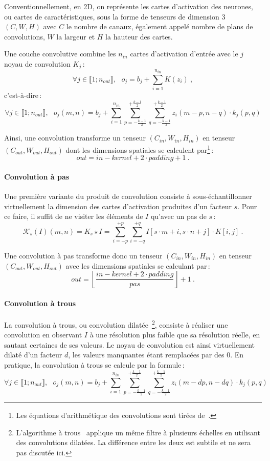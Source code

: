 Conventionnellement, en 2D, on représente les cartes d'activation des neurones, ou cartes de caractéristiques, sous la forme de tenseurs de dimension 3 $(C, W, H)$ avec $C$ le nombre de canaux, également appelé nombre de plans de convolutions, $W$ la largeur et $H$ la hauteur des cartes.

Une couche convolutive combine les $n_{in}$ cartes d'activation d'entrée avec le $j$\ieme{} noyau de convolution $K_j$\,:
$$\forall j \in \llbracket 1;n_{out} \rrbracket,~~~o_j = b_j + \sum_{i=1}^{n_{in}} K(z_i)~,$$ c'est-à-dire\,:
$$\forall j \in \llbracket 1;n_{out} \rrbracket,~~~o_j(m, n) = b_j + \sum_{i=1}^{n_{in}} \sum_{p=-\frac{k-1}{2}}^{+\frac{k-1}{2}} \sum_{q=-\frac{k-1}{2}}^{+\frac{k-1}{2}} z_i(m - p, n - q) \cdot k_j(p, q)$$

Ainsi, une convolution transforme un tenseur $(C_{in}, W_{in}, H_{in})$ en tenseur $(C_{out}, W_{out}, H_{out})$ dont les dimensions spatiales se calculent par\footnote{Les équations d'arithmétique des convolutions sont tirées de~\citet{dumoulin_guide_2016}.}\,:
$$\mathit{out} = \mathit{in} - \mathit{kernel} + 2\cdot \mathit{padding} + 1~.$$

\paragraph{Convolution à pas}

Une première variante du produit de convolution consiste à sous-échantillonner virtuellement la dimension des cartes d'activation produites d'un facteur $s$. Pour ce faire, il suffit de ne visiter les éléments de $I$ qu'avec un pas de $s$\,:
$$\mathcal{K}_s(I)(m,n) = K_s \star I = \sum_{i=-p}^{+p} \sum_{i=-q}^{+q} I[s \cdot m + i, s \cdot n + j] \cdot K[i, j]~.$$

Une convolution à pas transforme donc un tenseur $(C_{in}, W_{in}, H_{in})$ en tenseur $(C_{out}, W_{out}, H_{out})$ avec les dimensions spatiales se calculant par\,:
$$\mathit{out} = \left\lfloor \frac{\mathit{in} - \mathit{kernel} + 2 \cdot \mathit{padding}}{\mathit{pas}}\right\rfloor + 1~.$$

\paragraph{Convolution à trous}

La convolution à trous, ou convolution dilatée~\cite{yu_multi-scale_2015}\footnote{L'algorithme à trous~\cite{shensa_discrete_1992} applique un même filtre à plusieurs échelles en utilisant des convolutions dilatées. La différence entre les deux est subtile et ne sera pas discutée ici.}, consiste à réaliser une convolution en observant $I$ à une résolution plus faible que sa résolution réelle, en sautant certaines de ses valeurs. Le noyau de convolution est ainsi virtuellement dilaté d'un facteur $d$, les valeurs manquantes étant remplacées par des 0. En pratique, la convolution à trous se calcule par la formule\,:
$$\forall j \in \llbracket 1;n_{out} \rrbracket,~~~o_j(m, n) = b_j + \sum_{i=1}^{n_{in}} \sum_{p=-\frac{k-1}{2}}^{+\frac{k-1}{2}} \sum_{q=-\frac{k-1}{2}}^{+\frac{k-1}{2}} z_i(m - dp, n - dq) \cdot k_j(p, q)$$


